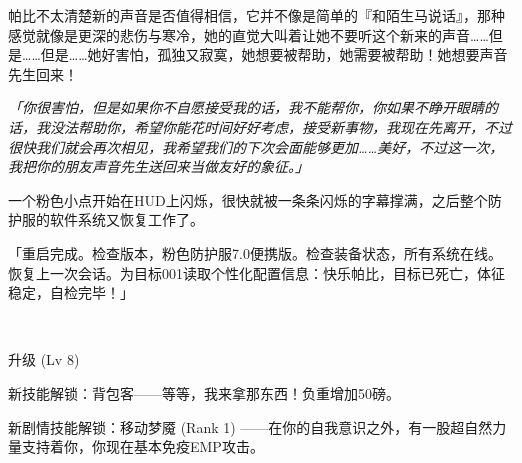 帕比不太清楚新的声音是否值得相信，它并不像是简单的『和陌生马说话』，那种感觉就像是更深的悲伤与寒冷，她的直觉大叫着让她不要听这个新来的声音……但是……但是……她好害怕，孤独又寂寞，她想要被帮助，她需要被帮助！她想要声音先生回来！

\emph{「你很害怕，但是如果你不自愿接受我的话，我不能帮你，你如果不睁开眼睛的话，我没法帮助你，希望你能花时间好好考虑，接受新事物，我现在先离开，不过很快我们就会再次相见，我希望我们的下次会面能够更加……美好，不过这一次，我把你的朋友声音先生送回来当做友好的象征。」}

一个粉色小点开始在HUD上闪烁，很快就被一条条闪烁的字幕撑满，之后整个防护服的软件系统又恢复工作了。

「{\mt 重启完成。检查版本，粉色防护服7.0便携版。检查装备状态，所有系统在线。恢复上一次会话。为目标001读取个性化配置信息：快乐帕比，目标已死亡，体征稳定，自检完毕！}」

~\vfill

\begin{note}
    升级 (Lv 8) 

    新技能解锁：背包客——等等，我来拿那东西！负重增加50磅。

    新剧情技能解锁：移动梦魇 (Rank 1) ——在你的自我意识之外，有一股超自然力量支持着你，你现在基本免疫EMP攻击。
\end{note}


